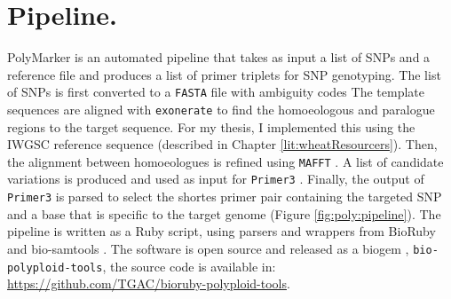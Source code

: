 \section{Pipeline. }
PolyMarker is an automated pipeline that takes as input a list of SNPs and a reference file and produces a list of primer triplets for SNP genotyping. 
The list of SNPs is first converted to a \verb|FASTA| file with ambiguity codes \citep{Cornish-Bowden1985} 
The template sequences are aligned with \verb|exonerate| \citep{Slater2005}  to find the homoeologous and paralogue regions to the target sequence.
For my thesis, I implemented this using the IWGSC reference sequence (described in Chapter \ref{lit:wheatResourcers}).  
Then, the alignment between homoeologues is refined using \verb|MAFFT| \citep{Katoh2013}. 
A list of candidate variations is produced and used as input for \verb|Primer3| \citep{Rozen}. 
Finally, the output of \verb|Primer3| is parsed to select the shortes primer pair containing the targeted SNP and a base that is specific to the target genome (Figure \ref{fig:poly:pipeline}).  
The pipeline is written as a Ruby script, using parsers and wrappers from BioRuby \citep{Goto2010} and bio-samtools \citep{Etherington2015,Ramirez-Gonzalez2012}. 
The software is open source and released as a biogem \citep{Bonnal2012}, \verb|bio-polyploid-tools|, the source code is available in: \url{https://github.com/TGAC/bioruby-polyploid-tools}.

